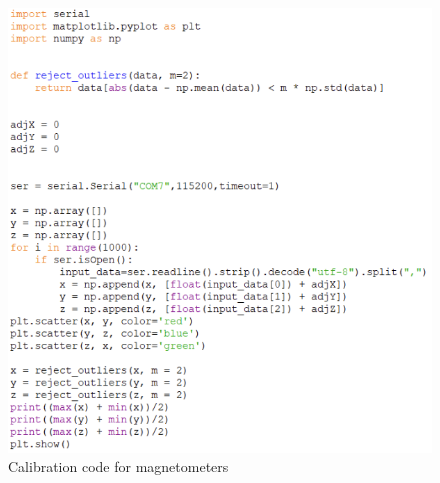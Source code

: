     \begin{figure}[ht]
        \centering
        \includegraphics[width=1.0\textwidth]{images/calibration.png}
        \caption{Calibration code for magnetometers}
        \label{fig:calibration}
    \end{figure}